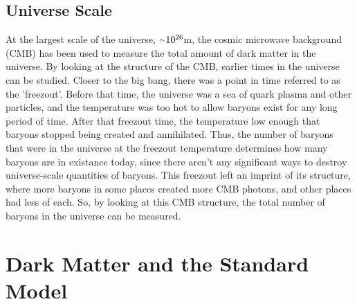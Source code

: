 

\subsection{Universe Scale}
%
At the largest scale of the universe, $\nicetilde 10^{26}$m, the cosmic microwave background (CMB) has been used to measure the total amount of dark matter in the universe.
By looking at the structure of the CMB, earlier times in the universe can be studied.
Closer to the big bang, there was a point in time referred to as the 'freezout'.
Before that time, the universe was a sea of quark plasma and other particles, and the temperature was too hot to allow baryons exist for any long period of time.
After that freezout time, the temperature low enough that baryons stopped being created and annihilated.
Thus, the number of baryons that were in the universe at the freezout temperature determines how many baryons are in existance today, since there aren't any significant ways to destroy universe-scale quantities of baryons.
This freezout left an imprint of its structure, where more baryons in some places created more CMB photons, and other places had less of each.
So, by looking at this CMB structure, the total number of baryons in the universe can be measured.



\section{Dark Matter and the Standard Model}

